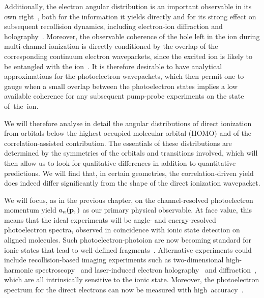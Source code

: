 Additionally, the electron angular distribution is an important observable in its own right~\cite{meckel_LIED_2008, pavicic_angular-dependence-measurement_2007, zhou_angular-dependence-theory_2005, zhao_molecular-orbital-theory_2011}, both for the information it yields directly and for its strong effect on subsequent recollision dynamics, including electron-ion diffraction and holography~\cite{spanner_reading-diffraction-images_2004, yurchenko_laser-induced-rescattering_2004, blaga_imaging_2012, huismans_holography-2011}. Moreover, the observable coherence of the hole left in the ion during multi-channel ionization is directly conditioned by the overlap of the corresponding continuum electron wavepackets, since the excited ion is likely to be entangled with the ion~\cite{ruberti_thesis_2004}. It is therefore desirable to have analytical approximations for the photoelectron wavepackets, which then permit one to gauge when a small overlap between the photoelectron states implies a low available coherence for any subsequent pump-probe experiments on the state of~the~ion.


We will therefore analyse in detail the angular distributions of direct ionization from orbitals below the highest occupied molecular orbital (HOMO) and of the correlation-assisted contribution. The essentials of these distributions are determined by the symmetries of the orbitals and transitions involved, which will then allow us to look for qualitative differences in addition to quantitative predictions. We will find that, in certain geometries, the correlation-driven yield does indeed differ significantly from the shape of the direct ionization wavepacket.


We will focus, as in the previous chapter, on the channel-resolved photoelectron momentum yield $a_n(\vb{p},)$ as our primary physical observable. At face value, this means that the ideal experiments will be angle- and energy-resolved photoelectron spectra, observed in coincidence with ionic state detection on aligned molecules. Such photoelectron-photoion are now becoming standard for ionic states that lead to well-defined fragments~\cite{boguslavskiy_multielectron-ionization_2012, reaction_microscope}. Alternative experiments could include recollision-based imaging experiments such as two-dimensional high-harmonic spectroscopy~\cite{shafir_resolving-tunnel-exit-times_2012} and laser-induced electron holography~\cite{spanner_reading-diffraction-images_2004, huismans_holography-2011} and diffraction~\cite{ spanner_reading-diffraction-images_2004, yurchenko_laser-induced-rescattering_2004, blaga_imaging_2012, lin_rescattering-self-imaging_2010}, which are all intrinsically sensitive to the ionic state. Moreover, the photoelectron spectrum for the direct electrons can now be measured with high~accuracy~\cite{arissian_precision-momentum-spectra_2010}.


